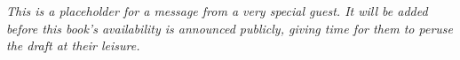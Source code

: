 

{\it This is a placeholder for a message from a very special guest. It will be added before this book's availability is announced publicly, giving time for them to peruse the draft at their leisure.}

\StopChapter

